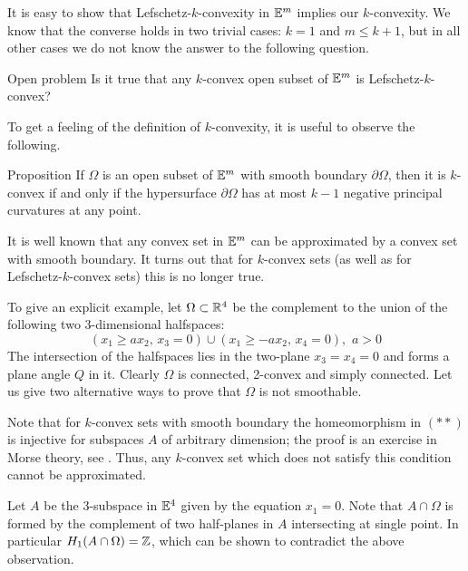 \documentclass[oneside,a4paper]{article}
\begin{document}
It is easy to show that Lefschetz-$k$-convexity in $\mathbb{E}^m$ implies our $k$-convexity.
We know that the converse holds in two trivial cases: $k=1$ and $m\le k+1$,
but in all other cases we do not know the answer to the following question.

\begin{thm}{Open problem}
Is it true that any $k$-convex open subset of $\mathbb{E}^m$ is Lefschetz-$k$-convex?
\end{thm}

To get a feeling of the definition of $k$-convexity,
it is useful to observe the following.

\begin{thm}{Proposition}\label{prop:smooth}
If $\Omega$ is an open subset of $\mathbb{E}^m$ with smooth boundary $\partial\Omega$,
then it is $k$-convex if and only if the hypersurface
$\partial\Omega$ has at most $k-1$ negative principal curvatures at any point.
\end{thm}

It is well known that any convex set in $\mathbb{E}^m$ can be approximated
 by a convex set with smooth boundary.
It turns out that for $k$-convex sets (as well as for Lefschetz-$k$-convex sets)
this is no longer true.

To give an explicit example, let $\Omega\subset\mathbb{R}^4$ be the complement to the union of the following two 3-dimensional halfspaces: $$(x_1\ge ax_2, \, x_3=0)\cup(x_1\ge -ax_2,\,x_4=0),\,\, a>0$$
The intersection of the halfspaces lies in the two-plane $x_3=x_4=0$ and 
forms a plane angle $Q$ in it.
Clearly $\Omega$ is connected, 2-convex and simply connected.
Let us give two alternative ways to prove that $\Omega$ is not smoothable.

Note that for $k$-convex sets with smooth boundary the homeomorphism in $({*}{*})$ is injective for subspaces $A$ of arbitrary dimension;
the proof is an exercise in Morse theory, see \cite[Section~$\tfrac12$]{gromov}.
Thus, any $k$-convex set which does not satisfy this condition cannot be approximated.

Let $A$ be the 3-subspace in $\mathbb{E}^4$ given by the equation 
$x_1=0$.
Note that $A\cap\Omega$ is formed by the complement of
two half-planes in $A$ intersecting at single point.
In particular $H_1(A\cap\Omega)=\mathbb{Z}$, 
which can be shown to contradict the above observation.
\end{document}
